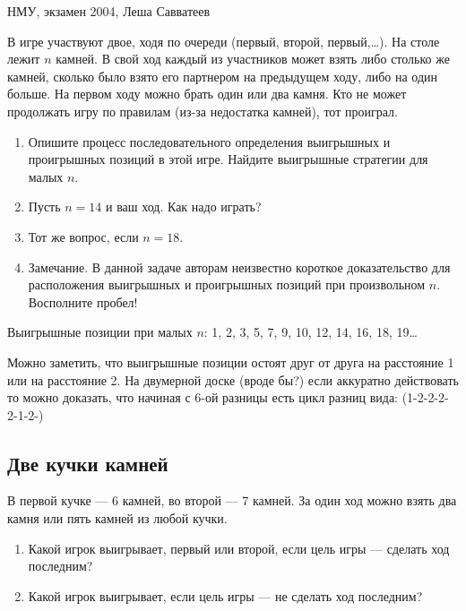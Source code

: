 \begin{problem}
\begin{source}
НМУ, экзамен 2004, Леша Савватеев
\end{source}
 В игре участвуют двое, ходя по очереди (первый, второй, первый,\ldots ). На столе лежит $n$ камней. В свой ход каждый из участников может взять либо столько же камней, сколько было взято его партнером на предыдущем ходу, либо на один больше. На первом ходу можно брать один или два камня. Кто не может продолжать игру по правилам (из-за недостатка камней), тот проиграл.
\begin{enumerate}
\item Опишите процесс последовательного определения выигрышных и проигрышных позиций в этой игре. Найдите выигрышные стратегии для малых $n$.
\item Пусть $n=14$ и ваш ход. Как надо играть?
\item  Тот же вопрос, если $n=18$.
\item Замечание. В данной задаче авторам неизвестно короткое доказательство для  расположения выигрышных и проигрышных позиций при произвольном $n$. Восполните пробел!
\end{enumerate}






\begin{sol}
Выигрышные позиции при малых $n$: 1, 2, 3, 5, 7, 9, 10, 12, 14, 16, 18, 19\ldots

Можно заметить, что выигрышные позиции остоят друг от друга на расстояние 1 или на расстояние 2. На двумерной доске (вроде бы?)  если аккуратно действовать то можно доказать, что начиная с 6-ой разницы есть цикл разниц вида: (1-2-2-2-2-1-2-)
\end{sol}
\end{problem}

\subsection{Две кучки камней}

\begin{problem}\par
В первой кучке --- 6 камней, во второй --- 7 камней. За один ход можно взять два камня или пять камней из любой кучки.\par
\begin{enumerate}
\item	Какой игрок выигрывает, первый или второй, если цель игры --- сделать ход последним?\par
\item	Какой игрок выигрывает, если цель игры --- не сделать ход последним?
\end{enumerate}


\begin{sol}

\end{sol}
\end{problem}


